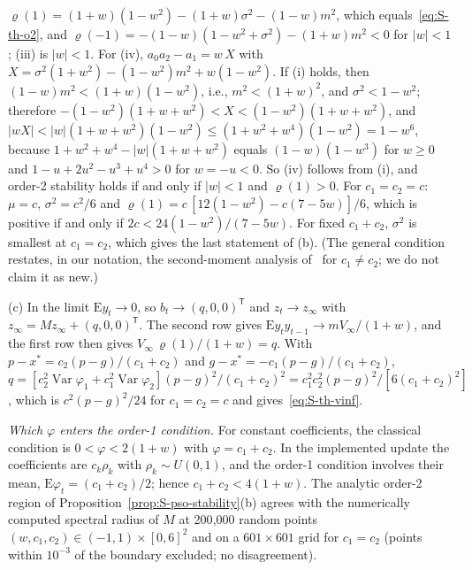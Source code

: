 \begin{thSproof}
$\varrho(1)=(1+w)(1-w^2)-(1+w)\sigma^2-(1-w)m^2$, which equals~\eqref{eq:S-th-o2}, and
$\varrho(-1)=-(1-w)(1-w^2+\sigma^2)-(1+w)m^2<0$ for $\lvert w\rvert<1$; (iii) is $\lvert w\rvert<1$. For (iv), $a_0a_2-a_1=w\,X$ with $X=\sigma^2(1+w^2)-(1-w^2)m^2+w(1-w^2)$. If (i) holds, then $(1-w)m^2<(1+w)(1-w^2)$, i.e., $m^2<(1+w)^2$, and $\sigma^2<1-w^2$; therefore $-(1-w^2)(1+w+w^2)<X<(1-w^2)(1+w+w^2)$, and $\lvert wX\rvert<\lvert w\rvert(1+w+w^2)(1-w^2)\le(1+w^2+w^4)(1-w^2)=1-w^6$, because $1+w^2+w^4-\lvert w\rvert(1+w+w^2)$ equals $(1-w)(1-w^3)$ for $w\ge0$ and $1-u+2u^2-u^3+u^4>0$ for $w=-u<0$. So (iv) follows from (i), and order-2 stability holds if and only if $\lvert w\rvert<1$ and $\varrho(1)>0$. For $c_1=c_2=c$: $\mu=c$, $\sigma^2=c^2/6$ and $\varrho(1)=c\,[12(1-w^2)-c(7-5w)]/6$, which is positive if and only if $2c<24(1-w^2)/(7-5w)$. For fixed $c_1+c_2$, $\sigma^2$ is smallest at $c_1=c_2$, which gives the last statement of (b). (The general condition restates, in our notation, the second-moment analysis of~\cite{Poli2009} for $c_1\ne c_2$; we do not claim it as new.)

(c) In the limit $\mathrm Ey_t\to0$, so $b_t\to(q,0,0)^{\mathsf T}$ and $z_t\to z_\infty$ with $z_\infty=Mz_\infty+(q,0,0)^{\mathsf T}$. The second row gives $\mathrm Ey_ty_{t-1}\to m V_\infty/(1+w)$, and the first row then gives $V_\infty\,\varrho(1)/(1+w)=q$. With $p-x^*=c_2(p-g)/(c_1+c_2)$ and $g-x^*=-c_1(p-g)/(c_1+c_2)$, $q=[c_2^2\operatorname{Var}\varphi_1+c_1^2\operatorname{Var}\varphi_2](p-g)^2/(c_1+c_2)^2=c_1^2c_2^2(p-g)^2/[6(c_1+c_2)^2]$, which is $c^2(p-g)^2/24$ for $c_1=c_2=c$ and gives~\eqref{eq:S-th-vinf}.
\end{thSproof}

\emph{Which $\varphi$ enters the order-1 condition.} For constant coefficients, the classical condition is $0<\varphi<2(1+w)$ with $\varphi=c_1+c_2$. In the implemented update the coefficients are $c_k\rho_k$ with $\rho_k\sim U(0,1)$, and the order-1 condition involves their mean, $\mathrm E\varphi_t=(c_1+c_2)/2$; hence $c_1+c_2<4(1+w)$. The analytic order-2 region of Proposition~\ref{prop:S-pso-stability}(b) agrees with the numerically computed spectral radius of $M$ at 200{,}000 random points $(w,c_1,c_2)\in(-1,1)\times[0,6]^2$ and on a $601\times601$ grid for $c_1=c_2$ (points within $10^{-3}$ of the boundary excluded; no disagreement).

